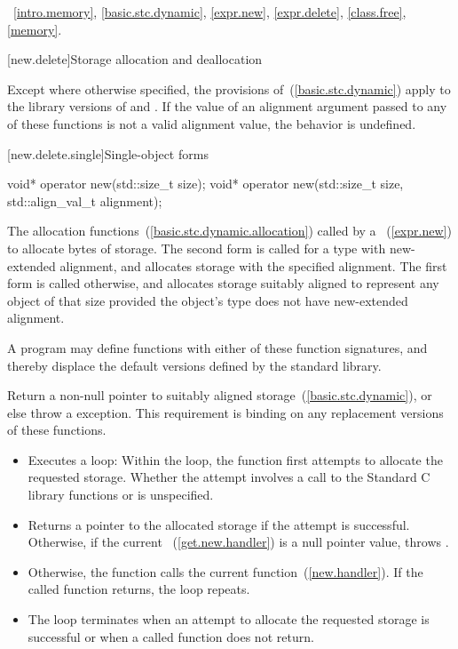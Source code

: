 \xref~\ref{intro.memory}, \ref{basic.stc.dynamic},
\ref{expr.new}, \ref{expr.delete}, \ref{class.free},
\ref{memory}.

[new.delete]{Storage allocation and deallocation}

\pnum
Except where otherwise specified, the provisions of~(\ref{basic.stc.dynamic})
apply to the library versions of  and .
If the value of an alignment argument
passed to any of these functions
is not a valid alignment value,
the behavior is undefined.

\newcommand{\replaceabledesc}[1]{%
A \Cpp program may define functions with #1 of these function signatures,
and thereby displace the default versions defined by the
\Cpp standard library.%
}

[new.delete.single]{Single-object forms}

%
\begin{itemdecl}
void* operator new(std::size_t size);
void* operator new(std::size_t size, std::align_val_t alignment);
\end{itemdecl}

\begin{itemdescr}
\pnum
\effects
The
allocation functions~(\ref{basic.stc.dynamic.allocation})
called by a
~(\ref{expr.new})
to allocate
 bytes of storage.
The second form is called for a type with new-extended alignment,
and allocates storage
with the specified alignment.
The first form is called otherwise,
and allocates storage
suitably aligned to represent any object of that size
provided the object's type does not have new-extended alignment.

\pnum
\replaceable
\replaceabledesc{either}

\pnum
\required 
Return a non-null pointer to suitably aligned storage~(\ref{basic.stc.dynamic}),
or else throw a
%
exception.
This requirement is binding on any replacement versions of these functions.

\pnum
{}

\begin{itemize}
\item
Executes a loop:
Within the loop, the function first attempts to allocate the requested storage.
Whether the attempt involves a call to the Standard C library functions
 or 
is unspecified.
%
\item
Returns a pointer to the allocated storage if the attempt is successful.
Otherwise, if the
current ~(\ref{get.new.handler}) is
a null pointer value, throws
.
\item
Otherwise, the function calls the current
 function~(\ref{new.handler}).
If the called function returns, the loop repeats.
\item
The loop terminates when an attempt to allocate the requested storage is
successful or when a called
function does not return.
\end{itemize}
\end{itemdescr}

